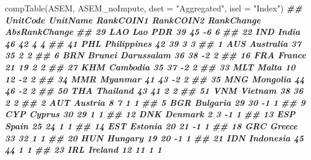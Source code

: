 \documentclass[
]{book}
\newenvironment{Shaded}{\begin{snugshade}}{\end{snugshade}}
\newcommand{\AttributeTok}[1]{\textcolor[rgb]{0.77,0.63,0.00}{#1}}
\newcommand{\DocumentationTok}[1]{\textcolor[rgb]{0.56,0.35,0.01}{\textbf{\textit{#1}}}}
\newcommand{\FunctionTok}[1]{\textcolor[rgb]{0.00,0.00,0.00}{#1}}
\newcommand{\NormalTok}[1]{#1}
\newcommand{\StringTok}[1]{\textcolor[rgb]{0.31,0.60,0.02}{#1}}
\begin{document}
\begin{Shaded}
\begin{Highlighting}[]
\FunctionTok{compTable}\NormalTok{(ASEM, ASEM\_noImpute, }\AttributeTok{dset =} \StringTok{"Aggregated"}\NormalTok{, }\AttributeTok{isel =} \StringTok{"Index"}\NormalTok{)}
\DocumentationTok{\#\#    UnitCode           UnitName RankCOIN1 RankCOIN2 RankChange AbsRankChange}
\DocumentationTok{\#\# 29      LAO            Lao PDR        39        45         {-}6             6}
\DocumentationTok{\#\# 22      IND              India        46        42          4             4}
\DocumentationTok{\#\# 41      PHL        Philippines        42        39          3             3}
\DocumentationTok{\#\# 1       AUS          Australia        37        35          2             2}
\DocumentationTok{\#\# 6       BRN  Brunei Darussalam        36        38         {-}2             2}
\DocumentationTok{\#\# 16      FRA             France        21        19          2             2}
\DocumentationTok{\#\# 27      KHM           Cambodia        35        37         {-}2             2}
\DocumentationTok{\#\# 33      MLT              Malta        10        12         {-}2             2}
\DocumentationTok{\#\# 34      MMR            Myanmar        41        43         {-}2             2}
\DocumentationTok{\#\# 35      MNG           Mongolia        44        46         {-}2             2}
\DocumentationTok{\#\# 50      THA           Thailand        43        41          2             2}
\DocumentationTok{\#\# 51      VNM            Vietnam        38        36          2             2}
\DocumentationTok{\#\# 2       AUT            Austria         8         7          1             1}
\DocumentationTok{\#\# 5       BGR           Bulgaria        29        30         {-}1             1}
\DocumentationTok{\#\# 9       CYP             Cyprus        30        29          1             1}
\DocumentationTok{\#\# 12      DNK            Denmark         2         3         {-}1             1}
\DocumentationTok{\#\# 13      ESP              Spain        25        24          1             1}
\DocumentationTok{\#\# 14      EST            Estonia        20        21         {-}1             1}
\DocumentationTok{\#\# 18      GRC             Greece        33        32          1             1}
\DocumentationTok{\#\# 20      HUN            Hungary        19        20         {-}1             1}
\DocumentationTok{\#\# 21      IDN          Indonesia        45        44          1             1}
\DocumentationTok{\#\# 23      IRL            Ireland        12        11          1             1}

\end{Highlighting}
\end{Shaded}
\end{document}
